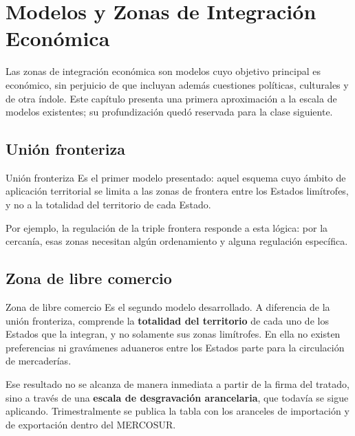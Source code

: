 \documentclass[12pt,oneside]{book}
\begin{document}
\chapter[Modelos y zonas de integración económica]{Modelos y Zonas de Integración Económica}

Las zonas de integración económica son modelos cuyo objetivo principal es económico, sin perjuicio de que incluyan además cuestiones políticas, culturales y de otra índole. Este capítulo presenta una primera aproximación a la escala de modelos existentes; su profundización quedó reservada para la clase siguiente.

\section{Unión fronteriza}

\begin{definition}{Unión fronteriza}
Es el primer modelo presentado: aquel esquema cuyo ámbito de aplicación territorial se limita a las zonas de frontera entre los Estados limítrofes, y no a la totalidad del territorio de cada Estado.
\end{definition}

Por ejemplo, la regulación de la triple frontera responde a esta lógica: por la cercanía, esas zonas necesitan algún ordenamiento y alguna regulación específica.

\section{Zona de libre comercio}

\begin{definition}{Zona de libre comercio}
Es el segundo modelo desarrollado. A diferencia de la unión fronteriza, comprende la \textbf{totalidad del territorio} de cada uno de los Estados que la integran, y no solamente sus zonas limítrofes. En ella no existen preferencias ni gravámenes aduaneros entre los Estados parte para la circulación de mercaderías.
\end{definition}

Ese resultado no se alcanza de manera inmediata a partir de la firma del tratado, sino a través de una \textbf{escala de desgravación arancelaria}, que todavía se sigue aplicando. Trimestralmente se publica la tabla con los aranceles de importación y de exportación dentro del MERCOSUR.
\end{document}
